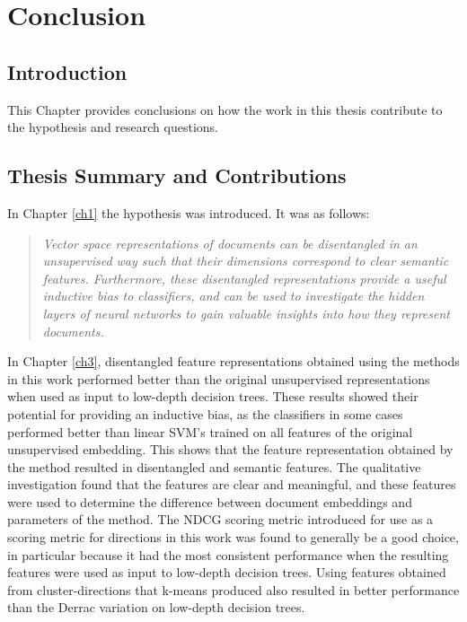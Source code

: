 \chapter{Conclusion}\label{ch6}





\section{Introduction}


This Chapter provides conclusions on how the work in this thesis contribute to the hypothesis and research questions. 

\section{Thesis Summary and Contributions}

In Chapter \ref{ch1} the hypothesis was introduced. It was as follows:  

\begin{quote}
\textit{Vector space representations of documents can be disentangled  in an unsupervised way such that their dimensions correspond to clear semantic features. Furthermore, these disentangled representations provide a useful inductive bias to classifiers, and can be used to  investigate the hidden layers of neural networks to gain valuable insights into how they represent documents. }
\end{quote}

In Chapter \ref{ch3}, disentangled feature representations obtained using the methods in this work performed better than the original unsupervised representations when used as input to low-depth decision trees. These results showed their potential for providing an inductive bias, as the classifiers in some cases performed better than linear SVM's trained on all features of the original unsupervised embedding. This shows that the feature representation obtained by the method resulted in disentangled and semantic features. The qualitative investigation found that the features are clear and meaningful, and these features were used to determine the difference between document embeddings and parameters of the method. The NDCG scoring metric introduced for use as a scoring metric for directions in this work was found to generally be a good choice, in particular because it had the most consistent performance when the resulting features were used as input to low-depth decision trees. Using features obtained from cluster-directions that k-means produced also resulted in better performance than the Derrac variation on low-depth decision trees.

